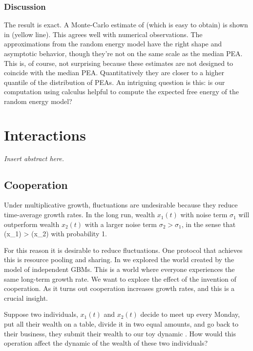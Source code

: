 \subsubsection{Discussion}
The \Ito result is exact. A Monte-Carlo estimate of  (which is easy to obtain) is 
shown in  (yellow line). This agrees well with numerical observations.
The approximations from the random energy model have the right shape and asymptotic behavior, 
though they're not on the same scale as the median PEA. This is, of course, not surprising because
these estimates are not designed to coincide with the median PEA. Quantitatively they are closer to 
a higher quantile of the distribution of PEAs. An intriguing question is this: is our computation 
using \Ito calculus helpful to compute the expected free energy of the random energy model? 

\section{Interactions}
{\it
Insert abstract here.
}
\newpage

\subsection{Cooperation}
Under multiplicative growth, fluctuations are undesirable because they reduce 
time-average growth rates. In the long run, wealth $x_1(t)$ with noise term 
$\sigma_1$ will outperform wealth $x_2(t)$ with a larger 
noise term $\sigma_2>\sigma_1$, in the sense that 
\be
\gt(x_1) > \gt(x_2)
\ee
with probability 1.

For this reason it is desirable to reduce fluctuations. One protocol that achieves this is 
resource pooling and sharing. In  we explored the world created 
by the model of independent GBMs. This is a world where everyone experiences the 
same long-term growth rate. We want to explore the effect of the invention of 
cooperation. As it turns out cooperation increases growth rates, and this is a 
crucial insight. 

Suppose two individuals, $x_1(t)$ and $x_2(t)$ decide to meet up every Monday, put all 
their wealth on a table, divide it in two equal amounts, and go back to their business, \ie
they submit their wealth to our toy dynamic . How 
would this operation affect the dynamic of the wealth of these two individuals?

